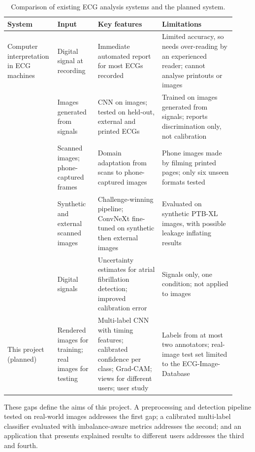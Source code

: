 \begin{table}[ht]
  \centering
  \footnotesize
  \caption{Comparison of existing ECG analysis systems and the planned system.}
  \label{tab:existing-systems}
  \begin{tabular}{@{}p{0.17\linewidth} p{0.17\linewidth} p{0.27\linewidth} p{0.31\linewidth}@{}}
    \toprule
    \textbf{System} & \textbf{Input} & \textbf{Key features} & \textbf{Limitations} \\
    \midrule
    Computer interpretation in ECG machines \cite{schlapfer_computer-interpreted_2017} &
      Digital signal at recording &
      Immediate automated report for most ECGs recorded &
      Limited accuracy, so needs over-reading by an experienced reader; cannot analyse printouts or images \\
    \textcite{sangha_automated_2022} &
      Images generated from signals &
      CNN on images; tested on held-out, external and printed ECGs &
      Trained on images generated from signals; reports discrimination only, not calibration \\
    \textcite{gliner_domain_2023} &
      Scanned images; phone-captured frames &
      Domain adaptation from scans to phone-captured images &
      Phone images made by filming printed pages; only six unseen formats tested \\
    \textcite{wang_pipeline_2025} &
      Synthetic and external scanned images &
      Challenge-winning pipeline; ConvNeXt fine-tuned on synthetic then external images &
      Evaluated on synthetic PTB-XL images, with possible leakage inflating results \\
    \textcite{chen_quantifying_2022} &
      Digital signals &
      Uncertainty estimates for atrial fibrillation detection; improved calibration error &
      Signals only, one condition; not applied to images \\
    \midrule
    This project (planned) &
      Rendered images for training; real images for testing &
      Multi-label CNN with timing features; calibrated confidence per class; Grad-CAM; views for different users; user study &
      Labels from at most two annotators; real-image test set limited to the ECG-Image-Database \\
    \bottomrule
  \end{tabular}
\end{table}

These gaps define the aims of this project. A preprocessing and detection pipeline tested
on real-world images addresses the first gap; a calibrated multi-label classifier
evaluated with imbalance-aware metrics addresses the second; and an application that
presents explained results to different users addresses the third and fourth.

